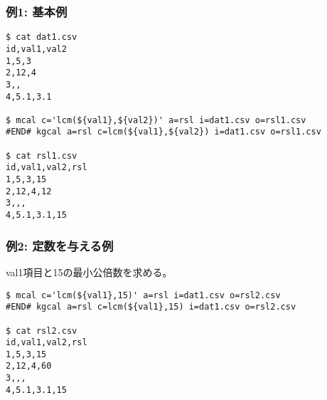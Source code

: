 
\subsubsection*{例1: 基本例}


\begin{Verbatim}[baselinestretch=0.7,frame=single]
$ cat dat1.csv
id,val1,val2
1,5,3
2,12,4
3,,
4,5.1,3.1

$ mcal c='lcm(${val1},${val2})' a=rsl i=dat1.csv o=rsl1.csv
#END# kgcal a=rsl c=lcm(${val1},${val2}) i=dat1.csv o=rsl1.csv

$ cat rsl1.csv
id,val1,val2,rsl
1,5,3,15
2,12,4,12
3,,,
4,5.1,3.1,15
\end{Verbatim}

\subsubsection*{例2: 定数を与える例}

val1項目と15の最小公倍数を求める。

\begin{Verbatim}[baselinestretch=0.7,frame=single]
$ mcal c='lcm(${val1},15)' a=rsl i=dat1.csv o=rsl2.csv
#END# kgcal a=rsl c=lcm(${val1},15) i=dat1.csv o=rsl2.csv

$ cat rsl2.csv
id,val1,val2,rsl
1,5,3,15
2,12,4,60
3,,,
4,5.1,3.1,15
\end{Verbatim}
